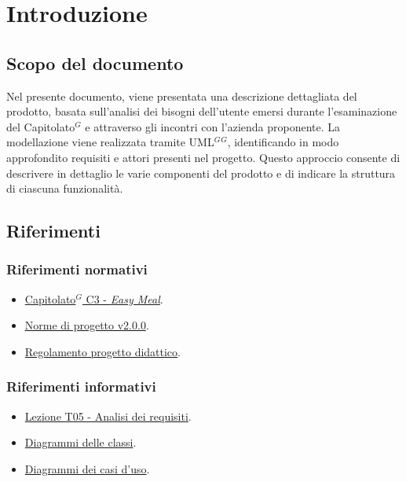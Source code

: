 \section{Introduzione}

\subsection{Scopo del documento}
Nel presente documento, viene presentata una descrizione dettagliata del prodotto, basata sull'analisi dei bisogni dell'utente 
emersi durante l'esaminazione del \gls{Capitolato}$^G$ e attraverso gli incontri con l'azienda proponente. 
La modellazione viene realizzata tramite \gls{UML}$^G$$^G$, identificando in modo approfondito requisiti e attori presenti nel progetto. 
Questo approccio consente di descrivere in dettaglio le varie componenti del prodotto e di indicare la struttura di ciascuna funzionalità.\\


\subsection{Riferimenti}
\subsubsection{Riferimenti normativi}
\begin{itemize}
    \item \href{https://www.math.unipd.it/~tullio/IS-1/2023/Progetto/C3.pdf}{\gls{Capitolato}$^G$ C3 - \textit{Easy Meal}}.
    \item \href{https://project-swenergy.\gls{\gls{Git}$^G$Hub}.io/}{Norme di progetto v2.0.0}.
    \item \href{https://www.math.unipd.it/~tullio/IS-1/2023/Dispense/PD2.pdf}{Regolamento progetto didattico}.
\end{itemize}

\subsubsection{Riferimenti informativi}
\begin{itemize}
    \item \href{https://www.math.unipd.it/~tullio/IS-1/2023/Dispense/T5.pdf}{Lezione T05 - Analisi dei requisiti}.
    \item \href{https://www.math.unipd.it/~rcardin/swea/2023/Diagrammi%20delle%20Classi.pdf}{Diagrammi delle classi}.
    \item \href{https://www.math.unipd.it/~rcardin/swea/2022/Diagrammi%20Use%20Case.pdf}{Diagrammi dei casi d'uso}.
\end{itemize}